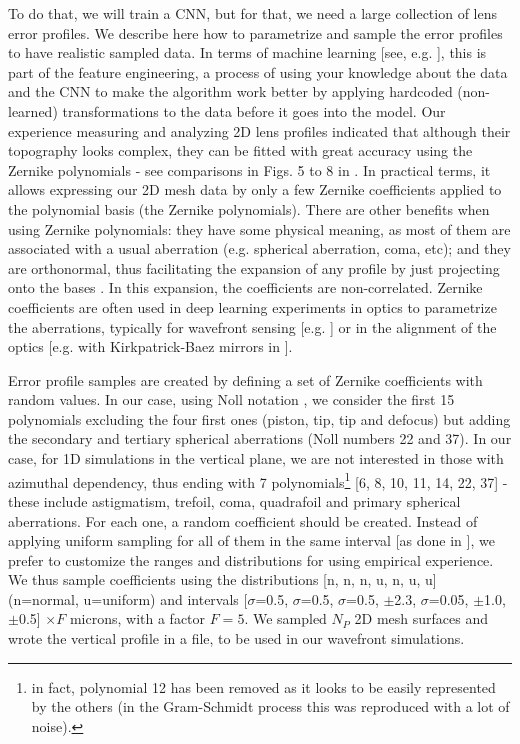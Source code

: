 \documentclass[preprint]{iucr}
\newcommand{\inred}[1]{{\color{red}#1}}
\begin{document}
To do that, we will train a CNN, but for that, we need a large collection of lens error profiles. We describe here how to parametrize and sample the error profiles to have realistic sampled data. In terms of machine learning [see, e.g. \cite{chollet_book}], this is part of the feature engineering, a process of using your knowledge about the data and the CNN to make the algorithm work better by applying hardcoded (non-learned) transformations to the data before it goes into the model.
Our experience measuring and analyzing 2D lens profiles indicated that although their topography looks complex, they can be fitted with great accuracy using the Zernike polynomials \inred{- see comparisons in Figs. 5 to 8 in \cite{Celestre2020}}. In practical terms, it allows expressing our 2D mesh data by only a few Zernike coefficients applied to the polynomial basis (the Zernike polynomials). There are other benefits when using Zernike polynomials: they have some physical meaning, as most of them are associated with a usual aberration (e.g. spherical aberration, coma, etc); and they are orthonormal, thus facilitating the expansion of any profile by just projecting onto the bases \inred{\cite{Mahajan2011}}. In this expansion, the coefficients are non-correlated. Zernike coefficients are often used in deep learning experiments in optics to parametrize the aberrations, typically for wavefront sensing [e.g. \cite{Saha2020}] or in the alignment of the optics [e.g. with Kirkpatrick-Baez mirrors in \cite{Luiz2022}]. 

Error profile samples are \inred{created by} defining a set of Zernike coefficients with random values. In our case, using Noll notation \cite{Noll:76}, we consider the first 15 polynomials excluding the four first ones (piston, tip, tip and defocus) but adding the secondary and \inred{tertiary} spherical aberrations (Noll numbers 22 and 37). In our case, for 1D simulations in the vertical plane, we are not interested in those with azimuthal dependency, thus ending with 7 polynomials\footnote{in fact, polynomial 12 has been removed as it looks to be easily represented by the others (in the Gram-Schmidt process this was reproduced with a lot of noise). } [6, 8, 10, 11, 14, 22, 37] - \inred{these include astigmatism, trefoil, coma, quadrafoil and primary spherical aberrations}. For each one, a random coefficient should be created. Instead of applying uniform sampling for all of them in the same interval [as done in \cite{Saha2020}], we prefer to customize the ranges and distributions for using empirical experience. We thus sample coefficients using the distributions [n, n, n, u, n, u, u]  (n=normal, u=uniform) and intervals [$\sigma$=0.5, $\sigma$=0.5, $\sigma$=0.5, $\pm$2.3, $\sigma$=0.05, $\pm$1.0, $\pm$0.5] $\times F$ microns, with a factor $F=5$. We sampled $N_P$ 2D mesh surfaces and wrote the vertical profile in a file, to be used in our wavefront simulations.
\end{document}
